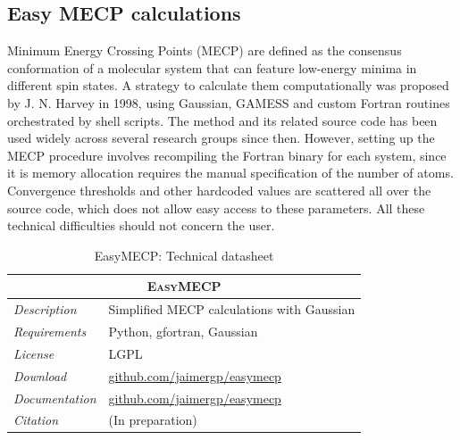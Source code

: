\subsection{Easy MECP calculations}

Minimum Energy Crossing Points (MECP) are defined as the consensus conformation of a molecular system that can feature low-energy minima in different spin states. A  strategy to calculate them computationally was proposed by J. N. Harvey in 1998,\cite{harvey1998} using Gaussian, GAMESS and custom Fortran routines orchestrated by shell scripts. The method and its related source code has been used widely across several research groups since then. However, setting up the MECP procedure involves recompiling the Fortran binary for each system, since it is memory allocation requires the manual specification of the number of atoms. Convergence thresholds and other hardcoded values are scattered all over the source code, which does not allow easy access to these parameters. All these technical difficulties should not concern the user.


\begin{table}[hbtp]
	\caption{EasyMECP: Technical datasheet}
	\footnotesize
	\newcommand{\tableheading}[1]{\multicolumn{2}{c}{\textsc{#1}}}
	\begin{tabularx}{\textwidth}{RL}
		\toprule
		\tableheading{EasyMECP}\\
		\toprule
		\textit{Description} & Simplified MECP calculations with Gaussian \\
		\midrule
		\textit{Requirements} & Python, gfortran, Gaussian \\
		\midrule
		\textit{License} & LGPL \\
		\midrule
		\textit{Download} & \href{https://github.com/jaimergp/easymecp}{github.com/jaimergp/easymecp} \\
		\midrule
		\textit{Documentation} & \href{https://github.com/jaimergp/easymecp}{github.com/jaimergp/easymecp} \\
		\midrule
		\textit{Citation} & (In preparation) \\
		\bottomrule

	\end{tabularx}
\end{table}

